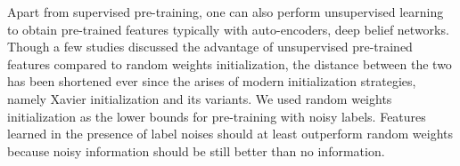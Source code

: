 

Apart from supervised pre-training, one can also perform unsupervised learning to obtain pre-trained features typically with auto-encoders\cite{vincent2010stacked,masci2011stacked}, deep belief networks\cite{hinton2006fast,lee2009convolutional}.
Though a few studies\cite{erhan2009difficulty,erhan2010does,bengio2012deep} discussed the advantage of unsupervised pre-trained features compared to random weights initialization, the distance between the two has been shortened ever since the arises of modern initialization strategies, namely Xavier initialization\cite{glorot2010understanding} and its variants.
We used random weights initialization as the lower bounds for pre-training with noisy labels.
Features learned in the presence of label noises should at least outperform random weights because noisy information should be still better than no information.

